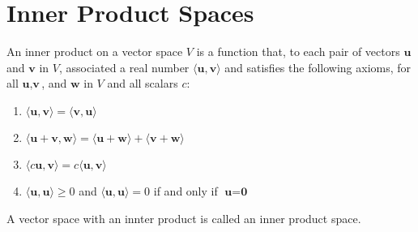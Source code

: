 \documentclass[../linalg.tex]{subfiles}
\begin{document}
\section{Inner Product Spaces}
\begin{definition}
    An inner product on a vector space $V$ is a function that, to each pair of vectors $\textbf{u}$ and $\textbf{v}$ in $V$, associated a real number $\langle \textbf{u},\textbf{v}\rangle$
    and satisfies the following axioms, for all $\textbf{u},\textbf{v}$, and $\textbf{w}$ in $V$ and all scalars $c$:
    \begin{enumerate}
        \item $\langle \textbf{u},\textbf{v}\rangle = \langle \textbf{v},\textbf{u}\rangle$
        \item $\langle \textbf{u}+\textbf{v}, \textbf{w}\rangle = \langle \textbf{u}+\textbf{w}\rangle + \langle \textbf{v}+\textbf{w}\rangle$
        \item $\langle c\textbf{u},\textbf{v}\rangle = c\langle \textbf{u},\textbf{v}\rangle$
        \item $\langle \textbf{u},\textbf{u}\rangle\geq 0$ and $\langle \textbf{u},\textbf{u}\rangle=0$ if and only if $\textbf{u}=\textbf{0}$
    \end{enumerate}
    A vector space with an innter product is called an inner product space.
\end{definition}
\end{document}
